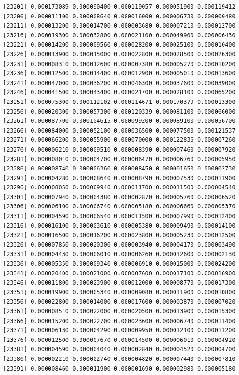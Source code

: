 \documentclass[]{article}
\begin{document}
\begin{verbatim}
[23201] 0.000173089 0.000090400 0.000119057 0.000051900 0.000119412
[23206] 0.000011100 0.000008640 0.000016000 0.000006730 0.000009480
[23211] 0.000013200 0.000014700 0.000003680 0.000007210 0.000012700
[23216] 0.000019300 0.000032800 0.000021100 0.000049900 0.000006430
[23221] 0.000014200 0.000009560 0.000028200 0.000025100 0.000010400
[23226] 0.000013900 0.000015000 0.000022800 0.000028500 0.000026300
[23231] 0.000008310 0.000012600 0.000007380 0.000005270 0.000010200
[23236] 0.000012500 0.000014400 0.000012900 0.000005010 0.000013600
[23241] 0.000047000 0.000036200 0.000046300 0.000037600 0.000039000
[23246] 0.000041500 0.000043400 0.000021700 0.000028100 0.000065200
[23251] 0.000075300 0.000112102 0.000114671 0.000170379 0.000013300
[23256] 0.000020300 0.000057300 0.000120339 0.000081100 0.000066000
[23261] 0.000087700 0.000104615 0.000099200 0.000089100 0.000056700
[23266] 0.000084000 0.000052100 0.000036500 0.000077500 0.000121537
[23271] 0.000066200 0.000055900 0.000070000 0.000122836 0.000007260
[23276] 0.000006210 0.000009510 0.000008390 0.000007460 0.000007920
[23281] 0.000008010 0.000004700 0.000006470 0.000006760 0.000005950
[23286] 0.000008740 0.000006360 0.000008450 0.000001650 0.000002730
[23291] 0.000004280 0.000008640 0.000008790 0.000007530 0.000011900
[23296] 0.000008050 0.000009940 0.000011700 0.000011500 0.000004540
[23301] 0.000007940 0.000004380 0.000002870 0.000005760 0.000006520
[23306] 0.000006100 0.000006740 0.000005180 0.000006660 0.000005370
[23311] 0.000004590 0.000006540 0.000011500 0.000007990 0.000012400
[23316] 0.000016100 0.000003610 0.000005380 0.000009490 0.000014100
[23321] 0.000016500 0.000016200 0.000023800 0.000005230 0.000012500
[23326] 0.000007850 0.000020300 0.000003940 0.000004170 0.000003490
[23331] 0.000004430 0.000006010 0.000006260 0.000012600 0.000002130
[23336] 0.000005350 0.000009340 0.000006910 0.000015000 0.000024200
[23341] 0.000020400 0.000021000 0.000007600 0.000017100 0.000016900
[23346] 0.000011800 0.000023900 0.000012000 0.000008770 0.000017300
[23351] 0.000019900 0.000005340 0.000009080 0.000011900 0.000010800
[23356] 0.000022800 0.000014000 0.000017600 0.000003870 0.000007020
[23361] 0.000008510 0.000022000 0.000020500 0.000013900 0.000015300
[23366] 0.000015200 0.000022700 0.000023600 0.000006740 0.000011400
[23371] 0.000006130 0.000004290 0.000009950 0.000012100 0.000011200
[23376] 0.000012500 0.000007670 0.000014500 0.000006010 0.000004920
[23381] 0.000004590 0.000004040 0.000002840 0.000004520 0.000004700
[23386] 0.000002210 0.000002740 0.000004820 0.000007440 0.000007810
[23391] 0.000008460 0.000011900 0.000001690 0.000002980 0.000005180

\end{verbatim}
\end{document}
